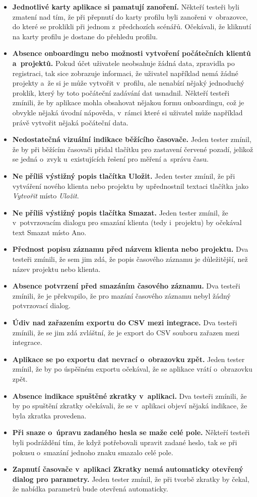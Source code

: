 \begin{itemize}
\item\textbf{Jednotlivé karty aplikace si pamatují zanoření.} Někteří testeři byli zmatení nad tím, že při přepnutí do karty profilu byli zanořeni v~obrazovce, do které se proklikli při jednom z~předchozích scénářů. Očekávali, že kliknutí na karty profilu je dostane do přehledu profilu.
\item\textbf{Absence onboardingu nebo možnosti vytvoření počátečních klientů a~projektů.} Pokud účet uživatele neobsahuje žádná data, zpravidla po registraci, tak sice zobrazuje informaci, že uživatel například nemá žádné projekty a~že si je může vytvořit v~profilu, ale nenabízí nějaký jednoduchý proklik, který by toto počáteční zadávání dat usnadnil. Někteří testeři zmínili, že by aplikace mohla obsahovat nějakou formu onboardingu, což je obvykle nějaká úvodní nápověda, v~rámci které si uživatel může například právě vytvořit nějaká počáteční data.
\item\textbf{Nedostatečná vizuální indikace běžícího časovače.} Jeden tester zmínil, že by při běžícím časovači přidal tlačítku pro zastavení červené pozadí, jelikož se jedná o~zvyk u~existujících řešení pro měření a~správu času.
\item\textbf{Ne příliš výstižný popis tlačítka Uložit.} Jeden tester zmínil, že při vytváření nového klienta nebo projektu by upřednostnil textaci tlačítka jako \emph{Vytvořit} místo \emph{Uložit}.
\item\textbf{Ne příliš výstižný popis tlačítka Smazat.} Jeden tester zmínil, že v~potvrzovacím dialogu pro smazání klienta (tedy i~projektu) by očekával text Smazat místo Ano.
\item\textbf{Přednost popisu záznamu před názvem klienta nebo projektu.} Dva testeři zmínili, že sem jim zdá, že popis časového záznamu je důležitější, než název projektu nebo klienta.
\item\textbf{Absence potvrzení před smazáním časového záznamu.} Dva testeři zmínili, že je překvapilo, že pro mazání časového záznamu nebyl žádný potvrzovací dialog.
\item\textbf{Údiv nad zařazením exportu do CSV mezi integrace.} Dva testeři zmínili, že se jim zdá zvláštní, že je export do CSV souboru zařazen mezi integrace.
\item\textbf{Aplikace se po exportu dat nevrací o~obrazovku zpět.} Jeden tester zmínil, že by po úspěšném exportu očekával, že se aplikace vrátí o~obrazovku zpět.
\item\textbf{Absence indikace spuštěné zkratky v~aplikaci.} Dva testeři zmínili, že by po spuštění zkratky očekávali, že se v~aplikaci objeví nějaká indikace, že byla zkratka provedena.
\item\textbf{Při snaze o~úpravu zadaného hesla se maže celé pole.} Někteří testeři byli podráždění tím, že když potřebovali upravit zadané heslo, tak se při pokusu o~smazání jednoho znaku smazalo celé pole.
\item\textbf{Zapnutí časovače v~aplikaci Zkratky nemá automaticky otevřený dialog pro parametry.} Jeden tester zmínil, že při tvorbě zkratky by čekal, že nabídka parametrů bude otevřená automaticky.
\end{itemize}

